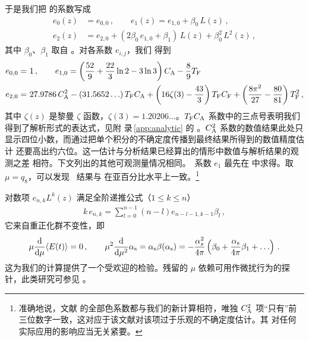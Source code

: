 于是我们把  的系数写成
\begin{equation}
  \begin{split}
    e_0(z) &= e_{0,0}\,,\qquad
    e_1(z) = e_{1,0} + \beta_0\,L(z)\,,\\
    e_2(z) &= e_{2,0} + (2\beta_0\,e_{1,0}+\beta_1)\,L(z) +
    \beta_0^2\,L^2(z)\,,
    \label{eq:efull}
  \end{split}
\end{equation}
其中 $\beta_0$、$\beta_1$ 取自 。对各系数 $e_{i,j}$，我们
得到
\begin{equation}
  \begin{split}
    e_{0,0} =&\ 1\,,\qquad
    e_{1,0} = \left(\frac{52}{9} + \frac{22}{3} \ln 2 - 3 \ln 3\right)
    C_\mathrm{A} - \frac{8}{9} T_\mathrm{F}\\
    e_{2,0} =&\ 27.9786\, C_\mathrm{A}^2  - (31.5652\ldots)\, T_\mathrm{F}C_\mathrm{A}
    + \left(16 \zeta(3) - \frac{43}{3}\right)
    T_\mathrm{F}C_\mathrm{F} + \left(\frac{8\pi^2}{27} -
    \frac{80}{81}\right) T_\mathrm{F}^2\,,
    \label{eq:econst}
  \end{split}
\end{equation}
其中 $\zeta(z)$ 是黎曼 $\zeta$ 函数，$\zeta(3) =
1.20206\ldots$。$T_\mathrm{F}C_\mathrm{A}$ 系数中的三点号表明我们得到了解析形式的表达式，见附
录\,\ref{app:analytic} 的 。$C_\mathrm{A}^2$ 系数的数值结果此处只
显示四位小数，而通过把单个积分的不确定度传播到最终结果所得到的数值精度估计
还要高出约六位。这一估计与分析结果已经算出的情形中数值与解析结果的观测之差
相符。下文列出的其他可观测量情况相同。\nlo\ 系数 $e_1$ 最先在
 中求得。取 $\mu=q_8$，可以发现 \nnlo\ 结果与
 在亚百分比水平上一致。\footnote{准确地说，文献
   的全部色系数都与我们的新计算相符，唯独 $C_\mathrm{A}^2$
  项``只有''前三位数字一致，这对应于该文献对该项过于乐观的不确定度估计。其
  对任何实际应用的影响应当无关紧要。}

对数项 $e_{n,k}L^k(z)$ 满足全阶递推公式（$1\leq k\leq n$）
\begin{equation}
  \begin{split}
    k\,e_{n,k} = \sum_{l=0}^{n-1}(n-l)e_{n-l-1,k-1}\beta_l\,,
  \end{split}
\end{equation}
它来自重正化群不变性，即
\begin{equation}
  \begin{split}
    \mu\frac{{\rm d} }{{\rm d} \mu}\langle E(t)\rangle = 0\,,\qquad
    \mu^2\frac{{\rm d} }{{\rm d} \mu^2}\alpha_\mathrm{s} = \alpha_\mathrm{s}\beta(\alpha_\mathrm{s}) =
    -\frac{\alpha^2_s}{4\pi}\left(\beta_0 + \frac{\alpha_\mathrm{s}}{4\pi}\beta_1
    + \ldots\right)\,.
    \label{eq:rgee}
  \end{split}
\end{equation}
这为我们的计算提供了一个受欢迎的检验。残留的 $\mu$ 依赖可用作微扰行为的探
针，此类研究可参见 。

